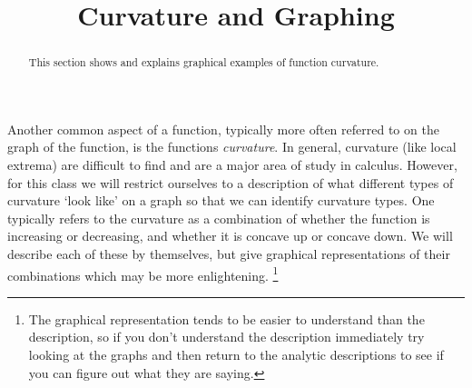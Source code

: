 \documentclass{ximeraXloud}
\title{Curvature and Graphing}
\begin{document}
\begin{abstract}
    This section shows and explains graphical examples of function curvature.
\end{abstract}
\maketitle


Another common aspect of a function, typically more often referred to on the graph of the function, is the functions \textit{curvature}. In general, curvature (like local extrema) are difficult to find and are a major area of study in calculus. However, for this class we will restrict ourselves to a description of what different types of curvature `look like' on a graph so that we can identify curvature types. One typically refers to the curvature as a combination of whether the function is increasing or decreasing, and whether it is concave up or concave down. We will describe each of these by themselves, but give graphical representations of their combinations which may be more enlightening.%
\footnote{The graphical representation tends to be easier to understand than the description, so if you don't understand the description immediately try looking at the graphs and then return to the analytic descriptions to see if you can figure out what they are saying.}
\end{document}
